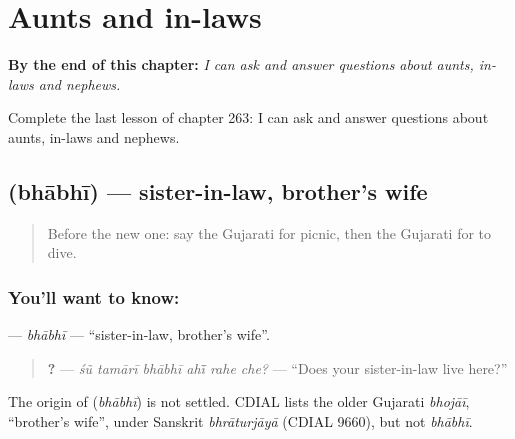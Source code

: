 
\chapter{Aunts and in-laws}
\label{ch:gu-aunts-and-in-laws}

\begin{chapteropening}
\textbf{By the end of this chapter:} \emph{I can ask and answer questions about aunts, in-laws and nephews.}

Complete the last lesson of chapter 263: I can ask and answer questions about aunts, in-laws and nephews.
\end{chapteropening}

\section[\texorpdfstring{\gu{ભાભી} (bhābhī)}{ભાભી (bhābhī)}]{ (bhābhī) — sister-in-law, brother's wife}

\label{lesson:GU-C263-bhabhi}



\begin{quote}
Before the new one: say the Gujarati for picnic, then the Gujarati for to dive.
\end{quote}

\subsection*{You'll want to know: }
\textbf{} — \emph{bhābhī} — \textquotedblleft{}sister-in-law, brother's wife\textquotedblright{}.

\begin{quote}
\textbf{     ?} — \emph{śũ tamārī bhābhī ahī̃ rahe che?} — \textquotedblleft{}Does your sister-in-law live here?\textquotedblright{}
\end{quote}

\begin{cousinweb}
The origin of \textbf{} (\emph{bhābhī}) is not settled. CDIAL lists the older Gujarati \emph{bhojāī}, \textquotedblleft{}brother's wife\textquotedblright{}, under Sanskrit \emph{bhrāturjāyā} (CDIAL 9660), but not \emph{bhābhī}.
\end{cousinweb}

